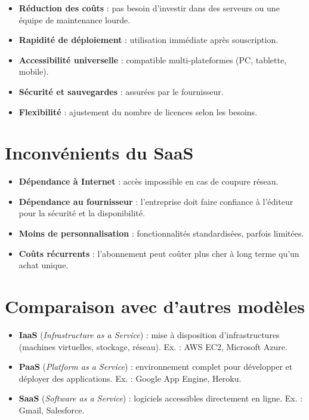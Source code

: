 \documentclass[a4paper,11pt]{article}
\begin{document}
\begin{tcolorbox}[title={Bénéfices}]
\begin{itemize}
  \item \textbf{Réduction des coûts} : pas besoin d’investir dans des serveurs ou une équipe de maintenance lourde.
  \item \textbf{Rapidité de déploiement} : utilisation immédiate après souscription.
  \item \textbf{Accessibilité universelle} : compatible multi-plateformes (PC, tablette, mobile).
  \item \textbf{Sécurité et sauvegardes} : assurées par le fournisseur.
  \item \textbf{Flexibilité} : ajustement du nombre de licences selon les besoins.
\end{itemize}
\end{tcolorbox}

\section*{Inconvénients du SaaS}

\begin{tcolorbox}[title={Limites}]
\begin{itemize}
  \item \textbf{Dépendance à Internet} : accès impossible en cas de coupure réseau.
  \item \textbf{Dépendance au fournisseur} : l’entreprise doit faire confiance à l’éditeur pour la sécurité et la disponibilité.
  \item \textbf{Moins de personnalisation} : fonctionnalités standardisées, parfois limitées.
  \item \textbf{Coûts récurrents} : l’abonnement peut coûter plus cher à long terme qu’un achat unique.
\end{itemize}
\end{tcolorbox}

\section*{Comparaison avec d’autres modèles}

\begin{tcolorbox}[title={IaaS, PaaS et SaaS}]
\begin{itemize}
  \item \textbf{IaaS} (\emph{Infrastructure as a Service}) : mise à disposition d’infrastructures (machines virtuelles, stockage, réseau). Ex. : AWS EC2, Microsoft Azure.
  \item \textbf{PaaS} (\emph{Platform as a Service}) : environnement complet pour développer et déployer des applications. Ex. : Google App Engine, Heroku.
  \item \textbf{SaaS} (\emph{Software as a Service}) : logiciels accessibles directement en ligne. Ex. : Gmail, Salesforce.
\end{itemize}
\end{tcolorbox}
\end{document}
